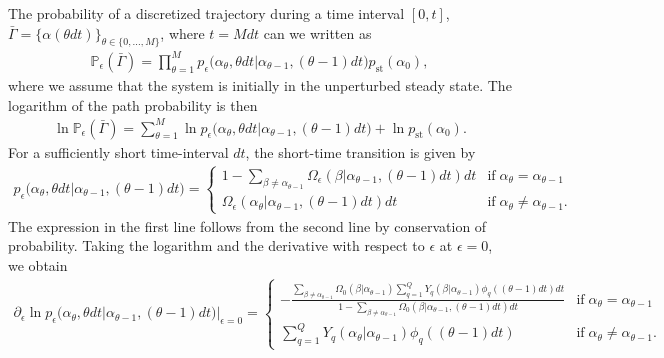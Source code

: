 \documentclass[aps,pre,twocolumn,superscriptaddress,notitlepage]{revtex4-2}
\begin{document}
The probability of a discretized trajectory during a time interval $[0,t]$, $\bar{\Gamma} = \lbrace \alpha(\theta dt) \rbrace_{\theta \in \lbrace 0,\ldots,M \rbrace}$, where $t = M dt$ can we written as
\begin{align}
\mathbb{P}_\epsilon(\bar{\Gamma}) = \prod_{\theta = 1}^M p_\epsilon\big(\alpha_\theta, \theta dt \vert \alpha_{\theta-1}, (\theta-1)dt \big) p_\text{st}(\alpha_0) ,
\end{align}
where we assume that the system is initially in the unperturbed steady state.
The logarithm of the path probability is then
\begin{align}
\ln \mathbb{P}_\epsilon(\bar{\Gamma}) = \sum_{\theta = 1}^M \ln p_\epsilon\big(\alpha_\theta, \theta dt \vert \alpha_{\theta-1}, (\theta-1)dt \big) + \ln p_\text{st}(\alpha_0) .
\end{align}
For a sufficiently short time-interval $dt$, the short-time transition is given by
\begin{align}
p_\epsilon\big(\alpha_\theta, \theta dt \vert \alpha_{\theta-1}, (\theta-1)dt \big) = \left\lbrace \begin{array}{ll}
1 - \sum_{\beta \neq \alpha_{\theta-1}} \Omega_\epsilon(\beta \vert \alpha_{\theta-1},(\theta - 1)dt) dt &\text{if} \; \alpha_\theta = \alpha_{\theta-1} \\[2ex]
\Omega_{\epsilon}(\alpha_\theta \vert \alpha_{\theta-1},(\theta - 1)dt) dt &\text{if} \; \alpha_\theta \neq \alpha_{\theta-1} .
\end{array}  \right.
\end{align}
The expression in the first line follows from the second line by conservation of probability.
Taking the logarithm and the derivative with respect to $\epsilon$ at $\epsilon = 0$, we obtain
\begin{align}
\partial_\epsilon \ln p_\epsilon\big(\alpha_\theta, \theta dt \vert \alpha_{\theta-1}, (\theta-1)dt \big) \Big\vert_{\epsilon = 0} = \left\lbrace \begin{array}{ll}
- \frac{ \sum_{\beta \neq \alpha_{\theta-1}} \Omega_0(\beta \vert \alpha_{\theta-1}) \sum_{q = 1}^Q Y_q(\beta \vert \alpha_{\theta-1}) \phi_q((\theta-1)dt) dt}{1 - \sum_{\beta \neq \alpha_{\theta-1}} \Omega_0(\beta \vert \alpha_{\theta-1},(\theta - 1)dt) dt} &\text{if} \; \alpha_\theta = \alpha_{\theta-1} \\[2ex]
\sum_{q = 1}^Q Y_q(\alpha_\theta \vert \alpha_{\theta-1}) \phi_q((\theta-1)dt) &\text{if} \; \alpha_\theta \neq \alpha_{\theta-1} .
\end{array}  \right.
\end{align}
\end{document}
